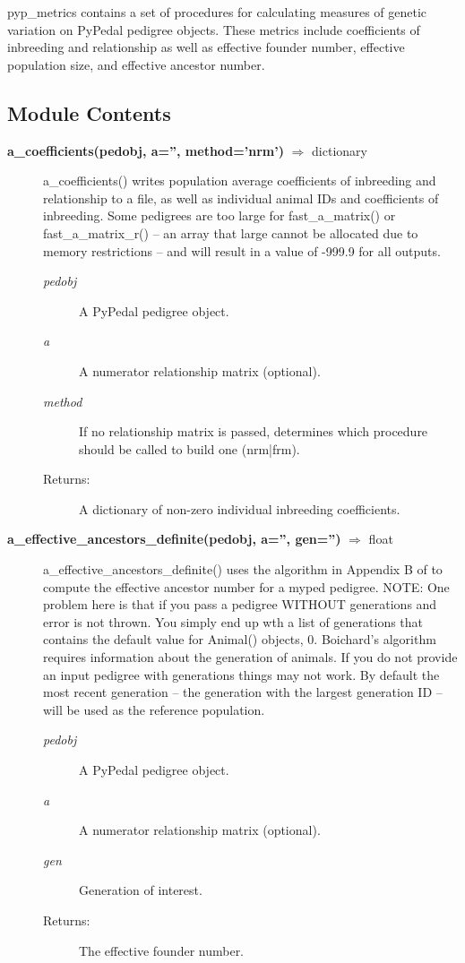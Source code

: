 pyp\_metrics contains a set of procedures for calculating measures of genetic variation on PyPedal pedigree objects. These metrics include coefficients of inbreeding and relationship as well as effective founder number, effective population size, and effective ancestor number.

\subsection*{Module Contents}
\begin{description}
\item[\textbf{a\_coefficients(pedobj, a='', method='nrm')} $\Rightarrow$ dictionary]
a\_coefficients() writes population average coefficients of inbreeding and relationship to a file, as well as individual animal IDs and coefficients of inbreeding. Some pedigrees are too large for fast\_a\_matrix() or fast\_a\_matrix\_r() -- an array that large cannot be allocated due to memory restrictions -- and will result in a value of -999.9 for all outputs.
\begin{description}
\item[\emph{pedobj}] A PyPedal pedigree object.
\item[\emph{a}] A numerator relationship matrix (optional).
\item[\emph{method}] If no relationship matrix is passed, determines which procedure should be called to build one (nrm|frm).
\item[Returns:] A dictionary of non-zero individual inbreeding coefficients.
\end{description}

\item[\textbf{a\_effective\_ancestors\_definite(pedobj, a='', gen='')} $\Rightarrow$ float]
a\_effective\_ancestors\_definite() uses the algorithm in Appendix B of  to compute the effective ancestor number for a myped pedigree. NOTE: One problem here is that if you pass a pedigree WITHOUT generations and error is not thrown. You simply end up wth a list of generations that contains the default value for Animal() objects, 0. Boichard's algorithm requires information about the generation of animals. If you do not provide an input pedigree with generations things may not work. By default the most recent generation -- the generation with the largest generation ID -- will be used as the reference population.
\begin{description}
\item[\emph{pedobj}] A PyPedal pedigree object.
\item[\emph{a}] A numerator relationship matrix (optional).
\item[\emph{gen}] Generation of interest.
\item[Returns:] The effective founder number.
\end{description}


\end{description}
